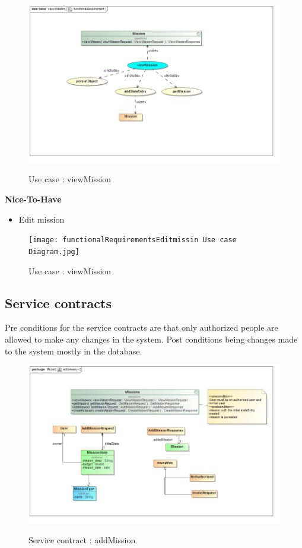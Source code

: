 \documentclass{article}
\begin{document}
\begin{flushleft}
				\begin{figure}[H]
					\includegraphics[width=\textwidth]{functionalRequirement_viewmission.jpg}  \\
					\caption{Use case : viewMission}
				\end{figure}

			\textbf{Nice-To-Have}
				\begin{itemize}
	  				\item Edit mission
				\end{itemize}
				
				\begin{figure}[H]
					\texttt{[image: functionalRequirementsEditmissin Use case Diagram.jpg]}  \\
					\caption{Use case : viewMission}
				\end{figure}
		\end{flushleft}
	\subsection{Service contracts}
	Pre conditions for the service contracts are that only authorized people are allowed to make any changes in the system. Post conditions being changes made to the system mostly in the database.
		\begin{figure}[H]
				\includegraphics[width=\textwidth]{serviceContract_addmission.jpg}  \\
				\caption{Service contract : addMission}
				\end{figure}
				
\end{document}

